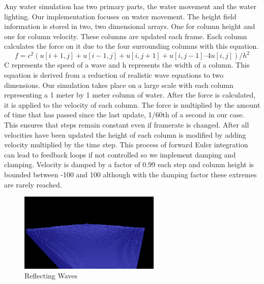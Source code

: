 \documentclass[11pt]{article}
\begin{document}
Any water simulation has two primary parts, the water movement and the water 
lighting. Our implementation focuses on water movement. The height field 
information is stored in two, two dimensional arrays. One for column height 
and one for column velocity. These columns are updated each frame. Each 
column calculates the force on it due to the four surrounding columns with this 
equation. \[ f = c^2 ( u[i+1,j] + u[i-1,j] + u[i,j+1] + u[i,j-1] – 4 u[i,j] 
)/h^2 \] C 
represents the speed of a wave and h represents the width of a column. This 
equation is derived from a reduction of realistic wave equations to two 
dimensions. Our simulation takes place on a large scale with each column 
representing a 1 meter by 1 meter column of water. After the force is 
calculated, it is applied to the velocity of each column. The force is 
multiplied by the amount of time that has passed since the last update, 1/60th 
of a second in our case. This ensures that steps remain constant even if 
framerate is changed. After all velocities have been updated the height of 
each column is modified by adding velocity multiplied by the time step. This 
process of forward Euler integration can lead to feedback loops if not 
controlled so we implement damping and clamping. Velocity is damped by a 
factor of 0.99 each step and column height is bounded between -100 and 100 
although with the damping factor these extremes are rarely reached.

\begin{figure}[H]
    \caption{Reflecting Waves}
    \label{fig:reflection}
    \centering
    \includegraphics[width=0.6\textwidth]{../www/images/bouncingWaves}
\end{figure}
	
\end{document}
